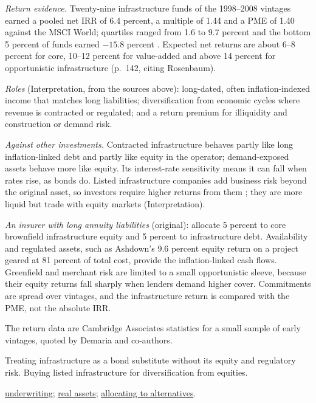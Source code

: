 \begin{qfmethod}\label{meth:infrastructure-allocation}
 \emph{Return evidence.} Twenty-nine infrastructure funds of the 1998--2008 vintages earned a pooled net IRR of 6.4 percent, a multiple of 1.44 and a PME of 1.40 against the MSCI World; quartiles ranged from 1.6 to 9.7 percent and the bottom 5 percent of funds earned $-15.8$ percent \citep[p.~142]{demaria-private-markets-2021}. Expected net returns are about 6--8 percent for core, 10--12 percent for value-added and above 14 percent for opportunistic infrastructure (p.~142, citing Rosenbaum).

\emph{Roles} (Interpretation, from the sources above): long-dated, often inflation-indexed income that matches long liabilities; diversification from economic cycles where revenue is contracted or regulated; and a return premium for illiquidity and construction or demand risk.

\emph{Against other investments.} Contracted infrastructure behaves partly like long inflation-linked debt and partly like equity in the operator; demand-exposed assets behave more like equity. Its interest-rate sensitivity means it can fall when rates rise, as bonds do. Listed infrastructure companies add business risk beyond the original asset, so investors require higher returns from them \citep[p.~122]{larreur-structured-finance-2021}; they are more liquid but trade with equity markets (Interpretation).

 \emph{An insurer with long annuity liabilities} (original): allocate 5 percent to core brownfield infrastructure equity and 5 percent to infrastructure debt. Availability and regulated assets, such as Ashdown's 9.6 percent equity return on a project geared at 81 percent of total cost, provide the inflation-linked cash flows. Greenfield and merchant risk are limited to a small opportunistic sleeve, because their equity returns fall sharply when lenders demand higher cover. Commitments are spread over vintages, and the infrastructure return is compared with the PME, not the absolute IRR.

 The return data are Cambridge Associates statistics for a small sample of early vintages, quoted by Demaria and co-authors.

 Treating infrastructure as a bond substitute without its equity and regulatory risk. Buying listed infrastructure for diversification from equities.

 \hyperref[meth:infrastructure-underwriting]{underwriting}; \hyperref[meth:real-assets-allocation]{real assets}; \hyperref[meth:alternatives-allocation-approaches]{allocating to alternatives}.

\end{qfmethod}
